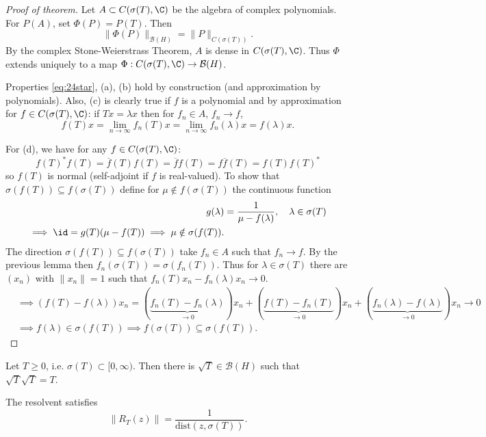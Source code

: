 \documentclass{article}
\begin{document}
\begin{proof}[Proof of theorem]
    Let $A \subset C(\sigma(T), \C)$ be the algebra of complex polynomials.
    For $P(A)$, set $\Phi(P) = P(T)$.  Then
    \begin{equation*}
        \|\Phi(P)\|_{\mathcal{B}(H)} = \|P\|_{C(\sigma(T))}.
    \end{equation*}
    By the complex Stone-Weierstrass Theorem, $A$ is dense in $C(\sigma(T), \C)$.
    Thus $\Phi$ extends uniquely to a map $\Phi: C(\sigma(T), \C) \to \mathcal{B}(H)$.

    Properties \eqref{eq:24star}, (a), (b) hold by construction (and approximation by polynomials).
    Also, (c) is clearly true if $f$ is a polynomial and by approximation for $f \in C(\sigma(T), \C)$:
    if $Tx = \lambda x$ then for $f_n \in A$, $f_n \to f$,
    \begin{equation*}
        f(T) x = \lim_{n \to \infty} f_n(T) x = \lim_{n \to \infty} f_n(\lambda) x = f(\lambda) x.
    \end{equation*}

    For (d), we have for any $f \in C(\sigma(T), \C)$:
    \begin{equation*}
        f(T)^* f(T) = \overline{f}(T) f(T) = \overline{f}f(T) = f \overline{f}(T) = f(T) f(T)^*
    \end{equation*}
    so $f(T)$ is normal (self-adjoint if $f$ is real-valued).
    To show that $\sigma(f(T)) \subseteq f(\sigma(T))$ define for $\mu \notin f(\sigma(T))$ the continuous function
    \begin{align*}
        g(\lambda) &= \frac{1}{\mu - f(\lambda)}, \quad \lambda \in \sigma(T) \\
        \implies \id = g(T) (\mu - f(T)) \implies \mu \notin \sigma(f(T)).
    \end{align*}
    The direction $\sigma(f(T)) \subseteq f(\sigma(T))$ take $f_n \in A$ such that $f_n \to f$.
    By the previous lemma then $f_n(\sigma(T)) = \sigma(f_n(T))$.
    Thus for $\lambda \in \sigma(T)$ there are $(x_n)$ with $\|x_n\| = 1$ such that $f_n(T) x_n - f_n(\lambda) x_n \to 0$.
    \begin{align*}
        &\implies (f(T) - f(\lambda)) x_n = (\underbrace{f_n(T) - f_n(\lambda)}_{\to 0}) x_n + (\underbrace{f(T) - f_n(T)}_{\to 0}) x_n + (\underbrace{f_n(\lambda) - f(\lambda)}_{\to 0}) x_n \to 0 \\
        &\implies f(\lambda) \in \sigma(f(T)) \implies f(\sigma(T)) \subseteq \sigma(f(T)).
    \end{align*}
\end{proof}

\begin{cor}
    Let $T \geq 0$, i.e. $\sigma(T) \subset [0, \infty)$. Then there is $\sqrt{T} \in \mathcal{B}(H)$ such that $\sqrt{T} \sqrt{T} =T$.
\end{cor}

\begin{cor}
    The resolvent satisfies
    \begin{equation*}
        \|R_T(z)\| = \frac{1}{\mathrm{dist}(z, \sigma(T))}.
    \end{equation*}
\end{cor}
\end{document}

